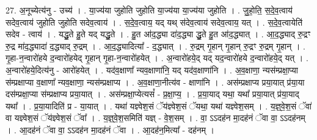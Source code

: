 \documentclass[17pt]{extarticle}
\begin{document}
27. अ॒नूच्येत्य॑नु - उच्य॑ । . या॒ज्य॑या जुहोति जुहोति या॒ज्य॑या या॒ज्य॑या जुहोति । . जु॒हो॒ति॒ स॒दे॒व॒त्वाय॑ सदेव॒त्वाय॑ जुहोति जुहोति सदेव॒त्वाय॑ । . स॒दे॒व॒त्वाय॒ यद् यथ् स॑देव॒त्वाय॑ सदेव॒त्वाय॒ यत् । . स॒दे॒व॒त्वायेति॑ सदेव - त्वाय॑ । . यद्धु॒ते हु॒ते यद् यद्धु॒ते । . हु॒त आ॑द॒द्ध्या दा॑द॒द्ध्या द्धु॒ते हु॒त आ॑द॒द्ध्यात् । . आ॒द॒द्ध्याद् रु॒द्रꣳ रु॒द्र मा॑द॒द्ध्यादा॑ द॒द्ध्याद् रु॒द्रम् । . आ॒द॒द्ध्यादित्या᳚ - द॒द्ध्यात् । . रु॒द्रम् गृ॒हान् गृ॒हान् रु॒द्रꣳ रु॒द्रम् गृ॒हान् । . गृ॒हा-न॒न्वारो॑हये द॒न्वारो॑हयेद् गृ॒हान् गृ॒हा-न॒न्वारो॑हयेत् । . अ॒न्वारो॑हये॒द् यद् यद॒न्वारो॑हये द॒न्वारो॑हये॒द् यत् । . अ॒न्वारो॑हये॒दित्य॑नु - आरो॑हयेत् । . यद॑व॒क्षाणा᳚ न्यव॒क्षाणा॑नि॒ यद् यद॑व॒क्षाणा॑नि । . अ॒व॒क्षाणा॒ न्यस॑म्प्रक्षा॒प्या स॑म्प्रक्षाप्या व॒क्षाणा᳚ न्यव॒क्षाणा॒ न्यस॑म्प्रक्षाप्य । . अ॒व॒क्षाणा॒नीत्य॑व - क्षाणा॑नि । . अस॑म्प्रक्षाप्य प्रया॒यात् प्र॑या॒या दस॑म्प्रक्षा॒प्या स॑म्प्रक्षाप्य प्रया॒यात् । . अस॑म्प्रक्षा॒प्येत्यसं᳚ - प्र॒क्षा॒प्य॒ । . प्र॒या॒याद् यथा॒ यथा᳚ प्रया॒यात् प्र॑या॒याद् यथा᳚ । . प्र॒या॒यादिति॑ प्र - या॒यात् । . यथा॑ यज्ञ्वेश॒सं ॅय॑ज्ञ्वेश॒सं ॅयथा॒ यथा॑ यज्ञ्वेश॒सम् । . य॒ज्ञ्॒वे॒श॒सं ॅवा॑ वा यज्ञ्वेश॒सं ॅय॑ज्ञ्वेश॒सं ॅवा᳚ । . य॒ज्ञ्॒वे॒श॒समिति॑ यज्ञ् - वे॒श॒सम् । . वा॒ ऽऽदह॑न मा॒दह॑नं ॅवा वा॒ ऽऽदह॑नम् । . आ॒दह॑नं ॅवा वा॒ ऽऽदह॑न मा॒दह॑नं ॅवा । . आ॒दह॑न॒मित्या᳚ - दह॑नम् । \newline
\end{document}
